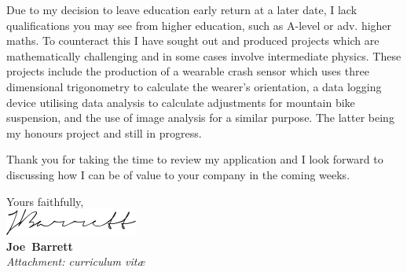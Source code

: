 \documentclass{article}
\def\firstname{Joe}
\def\surname{Barrett}
\def\FileAuthor{\firstname\ \surname}
\begin{document}
Due to my decision to leave education early return at a later date, I lack qualifications you may see from higher education, such as A-level or adv. higher maths. To counteract this I have sought out and produced projects which are mathematically challenging and in some cases involve intermediate physics. These projects include the production of a wearable crash sensor which uses three dimensional trigonometry to calculate the wearer's orientation, a data logging device utilising data analysis to calculate adjustments for mountain bike suspension, and the use of image analysis for a similar purpose. The latter being my honours project and still in progress.

Thank you for taking the time to review my application and I look forward to discussing how I can be of value to your company in the coming weeks.

Yours faithfully,\\[2em] %
%
\includegraphics{../sig.png}\\
{\bfseries \FileAuthor}\\
%
\vfill%
{\slshape Attachment: curriculum vit\ae{}}
\end{document}
